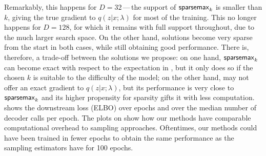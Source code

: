Remarkably, this happens for $D\!=\!32$\,---\,the support of
$\operatorname{\mathsf{sparsemax}_\text{$k$}}$ is smaller than $k$, giving the true gradient to
$q(z|x; \lambda)$ for most of the training. This no longer
happens for $D\!=\!128$, for which it remains with full support
throughout, due to the much larger search space. On the other hand,
\smap solutions become very sparse from the start in both cases,
while still obtaining good performance. There is, therefore, a
trade-off between the solutions we propose: on one hand,
$\operatorname{\mathsf{sparsemax}_\text{$k$}}$ can become exact with respect to the expectation in
, but it only does so if the chosen $k$ is suitable to
the difficulty of the model; on the other hand, \smap may not offer
an exact gradient to $q(z|x; \lambda)$, but its performance is
very close to $\operatorname{\mathsf{sparsemax}_\text{$k$}}$ and its higher propensity for sparsity
gifts it with less computation.  shows the
downstream loss (ELBO) over epochs and over the median number of
decoder calls per epoch. The plots on 
show how our methods have comparable computational overhead to
sampling approaches. Oftentimes, our methods could have been trained
in fewer epochs to obtain the same performance as the sampling
estimators have for 100 epochs.

